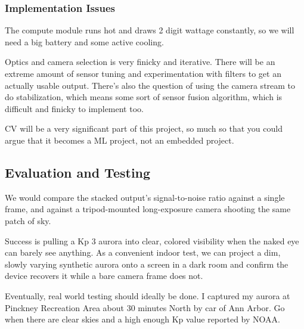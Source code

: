 \documentclass[11pt]{article}
\begin{document}
\subsubsection*{Implementation Issues}

The compute module runs hot and draws 2 digit wattage constantly, so we will need a big battery and some active cooling. 

Optics and camera selection is very finicky and iterative. There will be an extreme amount of sensor tuning and experimentation with filters to get an actually usable output. There's also the question of using the camera stream to do stabilization, which means some sort of sensor fusion algorithm, which is difficult and finicky to implement too. 

CV will be a very significant part of this project, so much so that you could argue that it becomes a ML project, not an embedded project.

\subsection*{Evaluation and Testing}

We would compare the stacked output's signal-to-noise ratio against a single frame, and against a tripod-mounted long-exposure camera shooting the same patch of sky. 

Success is pulling a Kp 3 aurora into clear, colored visibility when the naked eye can barely see anything. As a convenient indoor test, we can project a dim, slowly varying synthetic aurora onto a screen in a dark room and confirm the device recovers it while a bare camera frame does not. 

Eventually, real world testing should ideally be done. I captured my aurora at Pinckney Recreation Area about 30 minutes North by car of Ann Arbor. Go when there are clear skies and a high enough Kp value reported by NOAA. 
\end{document}
